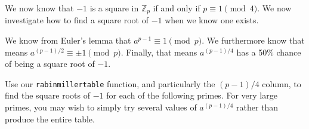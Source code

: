 \documentclass[12pt]{exam}
\newcommand{\Z}{\mathbb Z}
\begin{document}
\begin{questions}
  \question We now know that $-1$ is a square in $\Z_p$ if and only if $p\equiv1\pmod{4}$. We now investigate how to find a square root of $-1$ when we know one exists.

  We know from Euler's lemma that $a^{p-1}\equiv 1\pmod{p}$. We furthermore know that means $a^{(p-1)/2}\equiv \pm1\pmod{p}$. Finally, that means $a^{(p-1)/4}$ has a 50\% chance of being a square root of $-1$.

  Use our \texttt{rabinmillertable} function, and particularly the $(p-1)/4$ column, to find the square roots of $-1$ for each of the following primes. For very large primes, you may wish to simply try several values of $a^{(p-1)/4}$ rather than produce the entire table.

  \newpage
  \question 
  
\end{questions}
\end{document}
